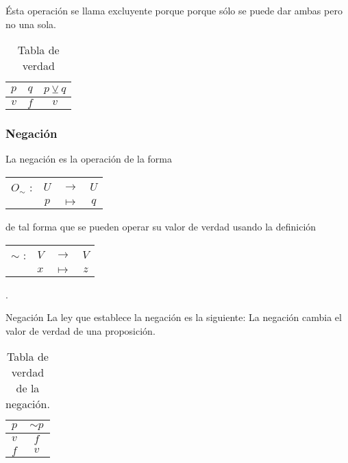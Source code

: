\nota Ésta operación se llama excluyente porque porque sólo se puede
dar ambas pero no una sola. 

\solucion

\begin{table}[H]
\centering

\caption{Tabla de verdad}


\begin{tabular}{c|c|c}
\arrayrulecolor{ptctitle}\cellcolor{gray!50}$p$ & \cellcolor{gray!50}$q$ & \cellcolor{gray!50}$p\veebar q$\tabularnewline
\hline 
\cellcolor{ptcbackground}$v$ & \cellcolor{ptcbackground}$f$ & \cellcolor{ptcbackground}$v$\tabularnewline
\hline 
\end{tabular}
\end{table}



\subsubsection{Negación}

La negación es la operación de la forma %
\begin{tabular}{cccc}
$O_{\sim}$ : & $U$ & $\rightarrow$ & %
$U$%
\tabularnewline
 & $p$ & $\mapsto$ & $q$\tabularnewline
\end{tabular}de tal forma que se pueden operar su valor de verdad usando la definición
\begin{tabular}{cccc}
$\sim$ : & $V$ & $\rightarrow$ & %
$V$%
\tabularnewline
 & $x$ & $\mapsto$ & $z$\tabularnewline
\end{tabular}.

\begin{definicionn}{Negación} La ley que establece la negación es
la siguiente: La negación cambia el valor de verdad de una proposición.\end{definicionn}

\begin{table}[H]
\centering

\caption{Tabla de verdad de la negación.}


\begin{tabular}{c|c}
\arrayrulecolor{ptctitle}\cellcolor{ptctitle!50}$p$ & \cellcolor{ptctitle!50}$\sim p$\tabularnewline
\hline 
\cellcolor{ptcbackground}$v$ & \cellcolor{ptcbackground}$f$\tabularnewline
\hline 
\cellcolor{gray!50}$f$ & \cellcolor{gray!50} $v$\tabularnewline
\end{tabular}
\end{table}



